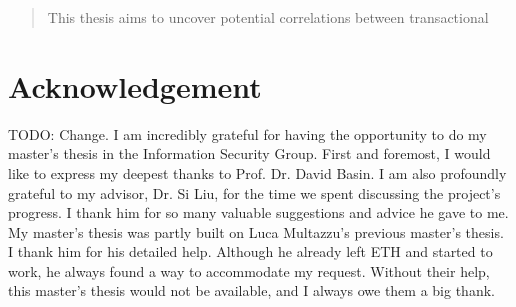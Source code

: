\begin{abstract}

This thesis aims to uncover potential correlations between transactional




  
\end{abstract}

\newpage

\section*{Acknowledgement}
TODO: Change.
I am incredibly grateful for having the opportunity to do my master's thesis in the Information Security Group. First and foremost, I would like to express my deepest thanks to Prof. Dr. David Basin. I am also profoundly grateful to my advisor, Dr. Si Liu, for the time we spent discussing the project's progress. I thank him for so many valuable suggestions and advice he gave to me. My master's thesis was partly built on Luca Multazzu's previous master's thesis. I thank him for his detailed help. Although he already left ETH and started to work, he always found a way to accommodate my request.
Without their help, this master's thesis would not be available, and I always owe them a big thank. 


